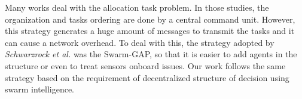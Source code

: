 Many works \cite{ferreira2007swarm,scerri2005allocatingLADCOP, ferreira2010robocup,ikemoto2010adaptive} deal with the allocation task problem. In those studies, the organization and tasks ordering are done by a central command unit. However, this strategy generates a huge amount of messages to transmit the tasks and it can cause a network overhead. To deal with this, the strategy adopted by \textit{Schwarzrock et al.}\cite{MAS07} was the Swarm-GAP, so that it is easier to add agents in the structure or even to treat sensors onboard issues. Our work follows the same strategy based on the requirement of decentralized structure of decision using swarm intelligence.